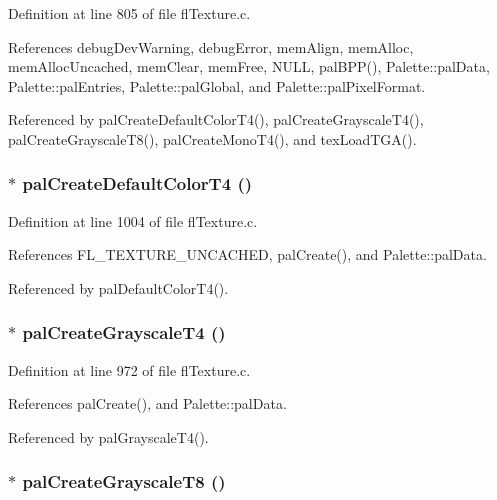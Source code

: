Definition at line 805 of file fl\-Texture.c.

References debug\-Dev\-Warning, debug\-Error, mem\-Align, mem\-Alloc, mem\-Alloc\-Uncached, mem\-Clear, mem\-Free, NULL, pal\-BPP(), Palette::pal\-Data, Palette::pal\-Entries, Palette::pal\-Global, and Palette::pal\-Pixel\-Format.

Referenced by pal\-Create\-Default\-Color\-T4(), pal\-Create\-Grayscale\-T4(), pal\-Create\-Grayscale\-T8(), pal\-Create\-Mono\-T4(), and tex\-Load\-TGA().
\subsubsection{$\ast$ pal\-Create\-Default\-Color\-T4 ()}\label{flTexture_8h_785a70ea2c158455b1f2217bfaac80c0}




Definition at line 1004 of file fl\-Texture.c.

References FL\_\-TEXTURE\_\-UNCACHED, pal\-Create(), and Palette::pal\-Data.

Referenced by pal\-Default\-Color\-T4().
\subsubsection{$\ast$ pal\-Create\-Grayscale\-T4 ()}\label{flTexture_8h_d5fed51ee2e1e83baaaa623b92819c2f}




Definition at line 972 of file fl\-Texture.c.

References pal\-Create(), and Palette::pal\-Data.

Referenced by pal\-Grayscale\-T4().
\subsubsection{$\ast$ pal\-Create\-Grayscale\-T8 ()}\label{flTexture_8h_8ffa2ade3f63babe659c20011e7249e8}




